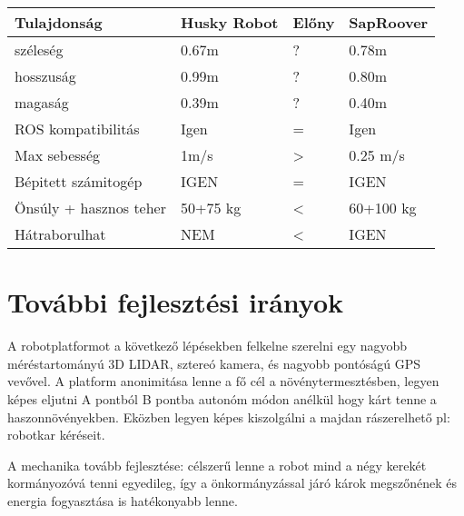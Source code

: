 \begin{center}
\begin{table}[]
\begin{tabular}{llll}
\hline Tulajdonság & Husky Robot & Előny & SapRoover \\ \hline
 széleség           &    0.67m    &    ?        &   0.78m        \\
   hosszuság        &    0.99m    &   ?        &   0.80m       \\
  magaság           &    0.39m    &   ?        &   0.40m        \\
 ROS 
 kompatibilitás           &    Igen         &   =    &   Igen        \\
   Max sebesség        &    1m/s  &     >   & 0.25 m/s    \\
   Bépitett számitogép        &    IGEN  &   =    & IGEN      \\
   Önsúly + hasznos teher & 50+75 kg &  <   & 60+100 kg \\
   Hátraborulhat & NEM &  <   & IGEN \\
\end{tabular}
\end{table}
\end{center}


\section{További fejlesztési irányok}

A robotplatformot a következő lépésekben felkelne szerelni egy nagyobb méréstartományú 3D LIDAR, sztereó kamera, és nagyobb pontóságú GPS vevővel.
A platform  anonimitása lenne a fő cél a növénytermesztésben, legyen képes eljutni A pontból B pontba autonóm módon anélkül hogy kárt tenne a haszonnövényekben. Eközben legyen képes kiszolgálni a majdan rászerelhető pl: robotkar kéréseit.

A mechanika tovább fejlesztése: célszerű lenne a robot mind a négy kerekét kormányozóvá tenni egyedileg, így a önkormányzással járó károk megszőnének és energia fogyasztása is hatékonyabb lenne.

